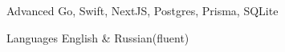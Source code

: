 
\begin{cvskills}

  \cvskill
    {Advanced}
    {Go, Swift, NextJS, Postgres, Prisma, SQLite}

  \cvskill
    {Languages}
    {English \& Russian(fluent)}

\end{cvskills}
